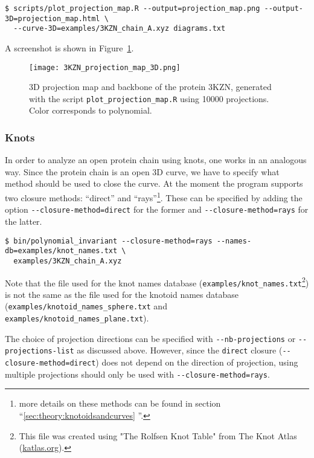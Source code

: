 \begin{lstlisting}
$ scripts/plot_projection_map.R --output=projection_map.png --output-3D=projection_map.html \
  --curve-3D=examples/3KZN_chain_A.xyz diagrams.txt
\end{lstlisting}
A screenshot is shown in Figure~\ref{fig:3KZN:projectionmap:3D}.
\begin{figure}[t]
\centering
\texttt{[image: 3KZN\_projection\_map\_3D.png]}
\caption{3D projection map and backbone of the protein 3KZN, generated with the script \lstinline{plot_projection_map.R} using 10000 projections. Color corresponds to polynomial.}\label{fig:3KZN:projectionmap:3D}
\end{figure}


\subsubsection{Knots}
In order to analyze an open protein chain using knots, one works in an analogous way. Since the protein chain is an open 3D curve, we have to specify what method should be used to close the curve. At the moment the program supports two closure methods: ``direct'' and ``rays''\footnote{more details on these methods can be found in section ``\ref{sec:theory:knotoidsandcurves} ''.}. These can be specified by adding the option \lstinline{--closure-method=direct} for the former and \lstinline{--closure-method=rays} for the latter.
\begin{lstlisting}
$ bin/polynomial_invariant --closure-method=rays --names-db=examples/knot_names.txt \
  examples/3KZN_chain_A.xyz
\end{lstlisting}
Note that the file used for the knot names database (\lstinline{examples/knot_names.txt}\footnote{This file was created using "The Rolfsen Knot Table" from The Knot Atlas (\url{katlas.org}).}) is not the same as the file used for the knotoid names database (\lstinline{examples/knotoid_names_sphere.txt} and \lstinline{examples/knotoid_names_plane.txt}).

The choice of projection directions can be specified with \lstinline{--nb-projections} or \lstinline{--projections-list} as discussed above. However, since the \lstinline{direct} closure (\lstinline{--closure-method=direct}) does not depend on the direction of projection, using multiple projections should only be used with \lstinline{--closure-method=rays}.

